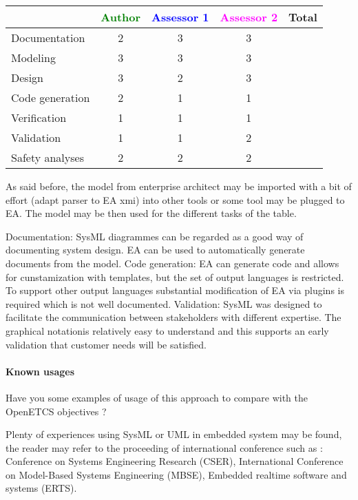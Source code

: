 \begin{tabular}{|l | c | c | c | c|}
\hline
& \textcolor{green}{Author} & \textcolor{blue}{Assessor 1} & \textcolor{magenta}{Assessor 2} & Total \\
\hline 
Documentation & 2 & 3 & 3 &  \\
\hline
Modeling & 3 & 3 & 3 &  \\
\hline
Design & 3 & 2 & 3 & \\
\hline
Code generation &2 & 1 & 1 & \\
\hline
Verification & 1 & 1 & 1 & \\
\hline
Validation & 1 & 1 & 2 & \\
\hline
Safety analyses & 2 & 2 & 2 & \\
\hline
\end{tabular}
\begin{author_comment}
As said before, the model from enterprise architect may be imported
with a bit of effort (adapt parser to EA xmi) into other tools or some
tool may be plugged to EA. The model may be then used for the
different tasks of the table.
\end{author_comment}
\begin{assessor2}
Documentation: SysML diagrammes can be regarded as a good way of documenting system design. EA can be used to automatically generate documents from the model.
Code generation: EA can generate code and allows for cunstamization with templates, but the set of output languages is restricted. To support other output languages substantial modification of EA via plugins is required which is not well documented.
Validation: SysML was designed to facilitate the communication between stakeholders with different expertise. The graphical notationis relatively easy to understand and this supports an early validation that customer needs will be satisfied.
\end{assessor2}


\paragraph{Known usages} Have you some examples of usage of this
approach to  compare with the OpenETCS objectives ?

Plenty of experiences using SysML or UML in embedded system may be
found, the reader may refer to the proceeding of international
conference such as : Conference on Systems Engineering
Research (CSER), International Conference on Model-Based Systems Engineering
(MBSE), Embedded realtime software and systems (ERTS).
 

